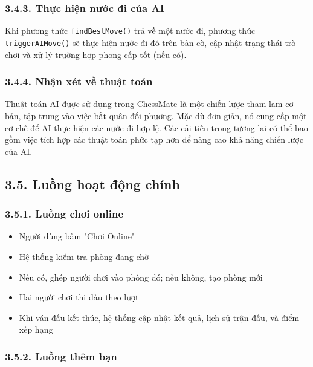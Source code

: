\documentclass[a4paper,12pt]{article}
\begin{document}
\subsubsection*{3.4.3. Thực hiện nước đi của AI}

\noindent Khi phương thức \texttt{findBestMove()} trả về một nước đi, phương thức \texttt{triggerAIMove()} sẽ thực hiện nước đi đó trên bàn cờ, cập nhật trạng thái trò chơi và xử lý trường hợp phong cấp tốt (nếu có).

\subsubsection*{3.4.4. Nhận xét về thuật toán}

\noindent Thuật toán AI được sử dụng trong ChessMate là một chiến lược tham lam cơ bản, tập trung vào việc bắt quân đối phương. Mặc dù đơn giản, nó cung cấp một cơ chế để AI thực hiện các nước đi hợp lệ. Các cải tiến trong tương lai có thể bao gồm việc tích hợp các thuật toán phức tạp hơn để nâng cao khả năng chiến lược của AI.

\subsection*{3.5. Luồng hoạt động chính} %

\subsubsection*{3.5.1. Luồng chơi online} %


\begin{itemize}[label=·]
    \item Người dùng bấm "Chơi Online"
    \item Hệ thống kiểm tra phòng đang chờ
    \item Nếu có, ghép người chơi vào phòng đó; nếu không, tạo phòng mới
    \item Hai người chơi thi đấu theo lượt
    \item Khi ván đấu kết thúc, hệ thống cập nhật kết quả, lịch sử trận đấu, và điểm xếp hạng
\end{itemize}

\subsubsection*{3.5.2. Luồng thêm bạn} %
\end{document}
